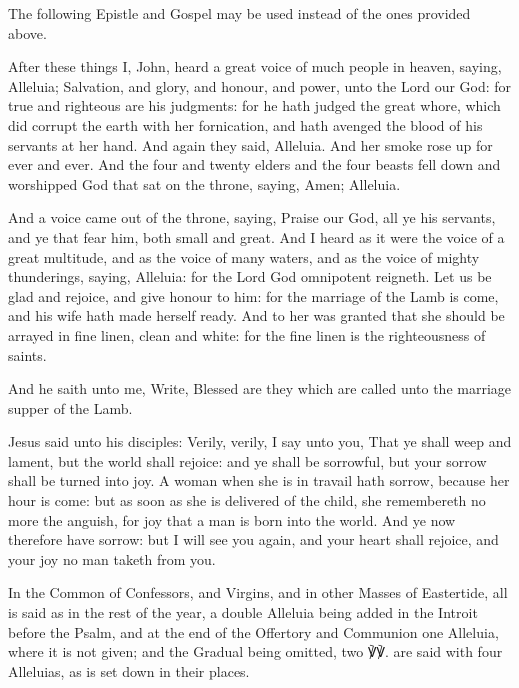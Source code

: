 \clearpage
\begin{rubric}
	The following Epistle and Gospel may be used instead of the ones provided above.
\end{rubric}

\label{Revelation191}
 After these things I, John, heard a great voice of much people in heaven, saying, Alleluia; Salvation, and glory, and honour, and power, unto the Lord our God: for true and righteous are his judgments: for he hath judged the great whore, which did corrupt the earth with her fornication, and hath avenged the blood of his servants at her hand. And again they said, Alleluia. And her smoke rose up for ever and ever. And the four and twenty elders and the four beasts fell down and worshipped God that sat on the throne, saying, Amen; Alleluia.

And a voice came out of the throne, saying, Praise our God, all ye his servants, and ye that fear him, both small and great. And I heard as it were the voice of a great multitude, and as the voice of many waters, and as the voice of mighty thunderings, saying, Alleluia: for the Lord God omnipotent reigneth. Let us be glad and rejoice, and give honour to him: for the marriage of the Lamb is come, and his wife hath made herself ready. And to her was granted that she should be arrayed in fine linen, clean and white: for the fine linen is the righteousness of saints.

And he saith unto me, Write, Blessed are they which are called unto the marriage supper of the Lamb. 

\label{John1620}
 Jesus said unto his disciples: Verily, verily, I say unto you, That ye shall weep and lament, but the world shall rejoice: and ye shall be sorrowful, but your sorrow shall be turned into joy. A woman when she is in travail hath sorrow, because her hour is come: but as soon as she is delivered of the child, she remembereth no more the anguish, for joy that a man is born into the world. And ye now therefore have sorrow: but I will see you again, and your heart shall rejoice, and your joy no man taketh from you.

\begin{rubric}
	In the Common of Confessors, and Virgins, and in other Masses of Eastertide, all is said as in the rest of the year, a double Alleluia being added in the Introit before the Psalm, and at the end of the Offertory and Communion one Alleluia, where it is not given; and the Gradual being omitted, two ℣℣. are said with four Alleluias, as is set down in their places.
\end{rubric}

